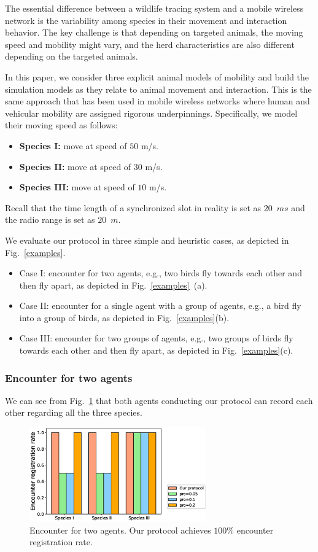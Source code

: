The essential difference between a wildlife tracing system
and a mobile wireless network is the variability among species in their movement and 
interaction behavior. The key challenge is that depending on targeted animals, 
the moving speed and mobility might vary, and 
the herd characteristics are also different depending on the targeted animals. 

In this paper, we consider three explicit animal models of mobility
and build the simulation models as they relate to animal movement and interaction. 
This is the same approach that has been used in mobile wireless networks where 
human and vehicular mobility are assigned rigorous underpinnings.
Specifically, we model their moving speed as follows:
\begin{itemize}
    \item \textbf{Species I:} move at speed of $50$ m/s. 
    \item \textbf{Species II:} move at speed of $30$ m/s. 
    \item \textbf{Species III:} move at speed of $10$ m/s. 
\end{itemize}
Recall that the time length of a synchronized slot in reality 
is set as $20$~$ms$ and the radio range is set as $20$~$m$.

We evaluate our protocol in three simple and heuristic cases, as depicted in Fig.~\ref{examples}.
\begin{itemize}
    \item Case I: encounter for two agents, 
    e.g., two birds fly towards each other and then 
    fly apart, as depicted in Fig.~\ref{examples}~(a). 
    \item Case II: encounter for a single 
    agent with a group of agents, e.g., a bird fly into 
    a group of birds, as depicted in Fig.~\ref{examples}(b).
    \item Case III: encounter for two groups of agents, 
    e.g., two groups of birds fly towards each other and then fly 
    apart, as depicted in Fig.~\ref{examples}(c).
\end{itemize}

\subsubsection{Encounter for two agents}

We can see from Fig.~\ref{fig7} that both
agents conducting our protocol can record each
other regarding all the three species.

\begin{figure}[!h]
    \centering
    \includegraphics[width=3in]{figures/figure7.eps}
    \caption{Encounter for two agents. Our protocol
    achieves $100\%$ encounter registration rate.}
    \label{fig7}
\end{figure}

